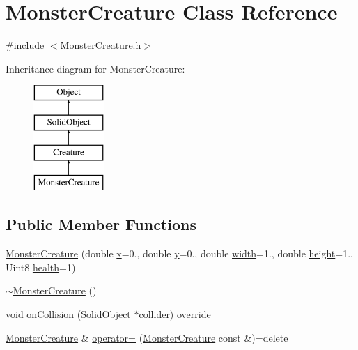 \hypertarget{class_monster_creature}{}\section{Monster\+Creature Class Reference}
\label{class_monster_creature}


{\ttfamily \#include $<$Monster\+Creature.\+h$>$}

Inheritance diagram for Monster\+Creature\+:\begin{figure}[H]
\begin{center}
\leavevmode
\includegraphics[height=4.000000cm]{class_monster_creature}
\end{center}
\end{figure}
\subsection*{Public Member Functions}
\begin{DoxyCompactItemize}
\item 
\hyperlink{class_monster_creature_a1d32d8d842daa208ef088aa9936912ea}{Monster\+Creature} (double \hyperlink{class_object_a02010c1708632be33a760486b1f648f8}{x}=0., double \hyperlink{class_object_a542c4d6094ace575fb4a28f46b9cc6a1}{y}=0., double \hyperlink{class_object_a3afad0ab476968e517b6f48c2a32719f}{width}=1., double \hyperlink{class_object_a811bf2cbf614c4f0a3935a83fb639ffd}{height}=1., Uint8 \hyperlink{class_creature_a312bc862a499a3955e74b5215d3bd1c5}{health}=1)
\item 
\hyperlink{class_monster_creature_aab9d0339f16ece9cd00acfb052234dab}{$\sim$\+Monster\+Creature} ()
\item 
void \hyperlink{class_monster_creature_ab7328cb9afd4b8fe1bacbc958ca9cc39}{on\+Collision} (\hyperlink{class_solid_object}{Solid\+Object} $\ast$collider) override
\item 
\hyperlink{class_monster_creature}{Monster\+Creature} \& \hyperlink{class_monster_creature_ab305accdda501279a05e1f0e0aea0a53}{operator=} (\hyperlink{class_monster_creature}{Monster\+Creature} const \&)=delete
\end{DoxyCompactItemize}
